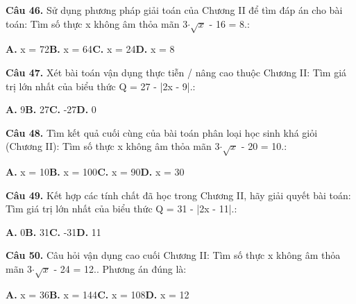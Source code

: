 \documentclass[11pt,a4paper]{article}
\begin{document}
\textbf{\color{primary} Câu 46.} Sử dụng phương pháp giải toán của Chương II để tìm đáp án cho bài toán: Tìm số thực x không âm thỏa mãn 3$\cdot$$\sqrt{x}$ - 16 = 8.:\par
\hspace*{1.5em}\textbf{A.} x = 72\quad\quad \textbf{B.} x = 64\quad\quad \textbf{C.} x = 24\quad\quad \textbf{D.} x = 8\par\vspace{2pt}
\textbf{\color{primary} Câu 47.} Xét bài toán vận dụng thực tiễn / nâng cao thuộc Chương II: Tìm giá trị lớn nhất của biểu thức Q = 27 - |2x - 9|.:\par
\hspace*{1.5em}\textbf{A.} 9\quad\quad \textbf{B.} 27\quad\quad \textbf{C.} -27\quad\quad \textbf{D.} 0\par\vspace{2pt}
\textbf{\color{primary} Câu 48.} Tìm kết quả cuối cùng của bài toán phân loại học sinh khá giỏi (Chương II): Tìm số thực x không âm thỏa mãn 3$\cdot$$\sqrt{x}$ - 20 = 10.:\par
\hspace*{1.5em}\textbf{A.} x = 10\quad\quad \textbf{B.} x = 100\quad\quad \textbf{C.} x = 90\quad\quad \textbf{D.} x = 30\par\vspace{2pt}
\textbf{\color{primary} Câu 49.} Kết hợp các tính chất đã học trong Chương II, hãy giải quyết bài toán: Tìm giá trị lớn nhất của biểu thức Q = 31 - |2x - 11|.:\par
\hspace*{1.5em}\textbf{A.} 0\quad\quad \textbf{B.} 31\quad\quad \textbf{C.} -31\quad\quad \textbf{D.} 11\par\vspace{2pt}
\textbf{\color{primary} Câu 50.} Câu hỏi vận dụng cao cuối Chương II: Tìm số thực x không âm thỏa mãn 3$\cdot$$\sqrt{x}$ - 24 = 12.. Phương án đúng là:\par
\hspace*{1.5em}\textbf{A.} x = 36\quad\quad \textbf{B.} x = 144\quad\quad \textbf{C.} x = 108\quad\quad \textbf{D.} x = 12\par\vspace{2pt}
\end{document}
